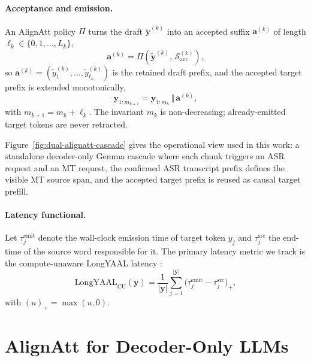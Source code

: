 \documentclass[11pt,twocolumn]{article}
\begin{document}
\paragraph{Acceptance and emission.}
An AlignAtt policy $\Pi$ turns the draft
$\widetilde{\mathbf{y}}^{(k)}$ into an accepted suffix
$\mathbf{a}^{(k)}$ of length $\ell_k \in \{0, 1, \ldots, L_k\}$,
\begin{equation}
  \mathbf{a}^{(k)} = \Pi\!\left(\widetilde{\mathbf{y}}^{(k)},\, \mathcal{S}^{(k)}_{\mathrm{acc}}\right),
  \label{eq:accept-prefix}
\end{equation}
so $\mathbf{a}^{(k)} = (\widetilde{y}^{(k)}_1, \ldots, \widetilde{y}^{(k)}_{\ell_k})$ is the
retained draft prefix,
and the accepted target prefix is extended monotonically,
\begin{equation}
  \mathbf{y}_{1:m_{k+1}} = \mathbf{y}_{1:m_k} \,\Vert\, \mathbf{a}^{(k)},
  \label{eq:monotone}
\end{equation}
with $m_{k+1} = m_k + \ell_k$. The invariant $m_k$ is non-decreasing;
already-emitted target tokens are never retracted.

Figure~\ref{fig:dual-alignatt-cascade} gives the operational view used in this
work: a standalone decoder-only Gemma cascade where each chunk triggers an ASR
request and an MT request, the confirmed ASR transcript prefix defines the
visible MT source span, and the accepted target prefix is reused as causal
target prefill.


\paragraph{Latency functional.}
Let $\tau^{\mathrm{emit}}_j$ denote the wall-clock emission time of target
token $y_j$ and $\tau^{\mathrm{src}}_j$ the end-time of the source word
responsible for it. The primary latency metric we track is the
compute-unaware LongYAAL latency \cite{longyaal25}:
\begin{equation}
  \mathrm{LongYAAL}_{\mathrm{CU}}(\mathbf{y})
  = \frac{1}{|\mathbf{y}|} \sum_{j=1}^{|\mathbf{y}|}
  \bigl(\tau^{\mathrm{emit}}_j - \tau^{\mathrm{src}}_j\bigr)_+,
  \label{eq:lya-cu}
\end{equation}
with $(u)_+ = \max(u,0)$.

\section{AlignAtt for Decoder-Only LLMs}
\label{sec:alignatt-llm}
\end{document}

